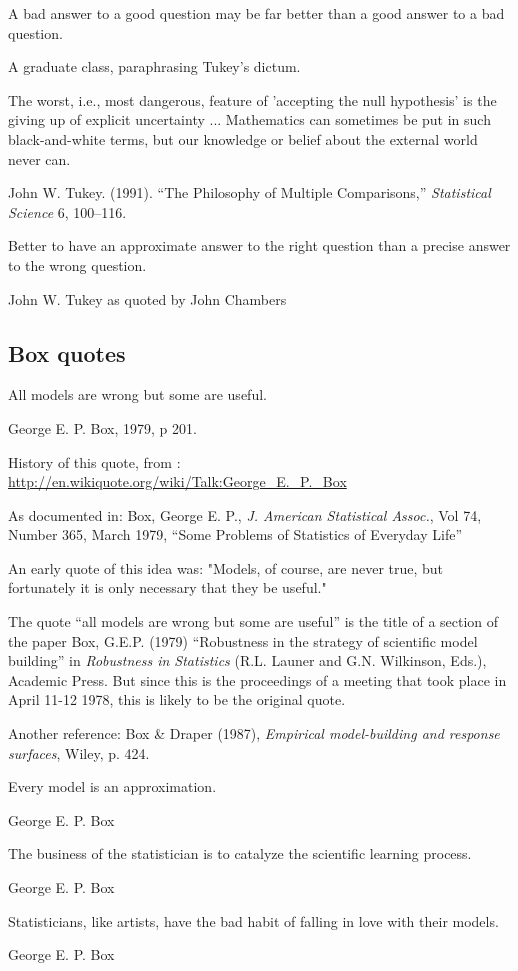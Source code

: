 \epigraph{A bad answer to a good question may be far better than a good answer to a bad question.}{A graduate class, paraphrasing Tukey's dictum.}

\epigraph{The worst, i.e., most dangerous, feature of 'accepting the null hypothesis' is the giving up of explicit uncertainty ... Mathematics can sometimes be put in such black-and-white terms, but our knowledge or belief about the external world never can.}{John W. Tukey. (1991). ``The Philosophy of Multiple Comparisons,'' \emph{Statistical Science} 6, 100--116.}

\epigraph{Better to have an approximate answer to the right question than a precise answer to the wrong question.}{John W. Tukey as quoted by John Chambers}


\subsection{Box quotes}

\epigraph{All models are wrong but some are useful.}{George E. P. Box, 1979, p 201.}

History of this quote, from : \url{http://en.wikiquote.org/wiki/Talk:George_E._P._Box}

As documented in: Box, George E. P., \emph{J. American Statistical Assoc.}, Vol 74, Number 365, March 1979, ``Some Problems of Statistics of Everyday Life''

An early quote of this idea was: "Models, of course, are never true, but fortunately it is only necessary that they be useful."

The quote ``all models are wrong but some are useful'' is the title of a section of the paper Box, G.E.P. (1979) ``Robustness in the strategy of scientific model building'' in \emph{Robustness in Statistics} (R.L. Launer and G.N. Wilkinson, Eds.), Academic Press. But since this is the proceedings of a meeting that took place in April 11-12 1978, this is likely to be the original quote.

Another reference: Box \& Draper (1987), \emph{Empirical model-building and response surfaces}, Wiley, p. 424.

\epigraph{Every model is an approximation.}{George E. P. Box}



\epigraph{The business of the statistician is to catalyze the scientific learning process.}{George E. P. Box}

\epigraph{Statisticians, like artists, have the bad habit of falling in love with their models.}{George E. P. Box}

